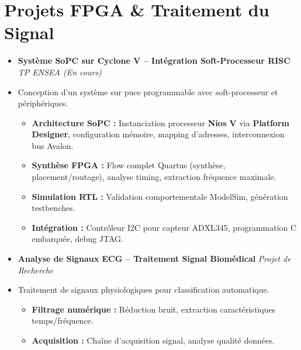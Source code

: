 \documentclass[a4paper,11pt]{article}
\begin{document}
\section{Projets FPGA \& Traitement du Signal}
\begin{itemize}[leftmargin=*, label={}]

\item \textbf{Système SoPC sur Cyclone V -- Intégration Soft-Processeur RISC} \hfill \textit{TP ENSEA (En cours)}
\vspace{-2pt}
\item \small{Conception d'un système sur puce programmable avec soft-processeur et périphériques.}
    \begin{itemize}[leftmargin=0.4cm, nosep, label=\tiny$\bullet$]
        \item \small{\textbf{Architecture SoPC :} Instanciation processeur \textbf{Nios V} via \textbf{Platform Designer}, configuration mémoire, mapping d'adresses, interconnexion bus Avalon.}
        \item \small{\textbf{Synthèse FPGA :} Flow complet Quartus (synthèse, placement/routage), analyse timing, extraction fréquence maximale.}
        \item \small{\textbf{Simulation RTL :} Validation comportementale ModelSim, génération testbenches.}
        \item \small{\textbf{Intégration :} Contrôleur I2C pour capteur ADXL345, programmation C embarquée, debug JTAG.}
    \end{itemize}
    \vspace{3pt}

\item \textbf{Analyse de Signaux ECG -- Traitement Signal Biomédical} \hfill \textit{Projet de Recherche}
\vspace{-2pt}
\item \small{Traitement de signaux physiologiques pour classification automatique.}
    \begin{itemize}[leftmargin=0.4cm, nosep, label=\tiny$\bullet$]
        \item \small{\textbf{Filtrage numérique :} Réduction bruit, extraction caractéristiques temps/fréquence.}
        \item \small{\textbf{Acquisition :} Chaîne d'acquisition signal, analyse qualité données.}
    \end{itemize}
    \vspace{3pt}


\end{itemize}
\end{document}
